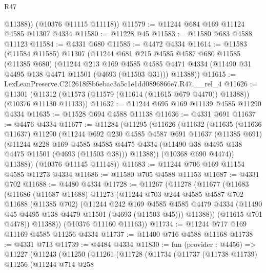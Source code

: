 \begin{lexlean}{R47}
\begin{coremodule}
          @11388))
      (@10376 @11115 @11118))
@11579 := @11244 @684 @169 @11124 @4585 @11307 @4334
@11580 := @11228 @45
@11583 := @11580 @683 @4588 @11123
@11584 := @4331 @680
@11585 := @4472 @4334
@11614 := @11583
    (@11584 @11585)
    @11307
    (@11244
      @681
      @215
      @4585
      @4587
      @680
      @11585
      (@11385 @680)
      (@11244
        @213
        @169
        @4585
        @4585
        @4471
        @4334
        (@11490 @31 @4495 @138 @4471 @11501 (@4693 (@11503 @31)))
        @11388))
@11615 := LexLeanPreserve.C212618f8b6ebac3a5c1e1dd0896866e7.R47.__rel_4
@11626 := @11301
    (@11312 (@11573 (@11579 (@11614 (@11615 @679 @4470)) @11388)) (@10376 @11130 @11133))
@11632 := @11244 @695 @169 @11139 @4585 @11290 @4334
@11635 := @11528 @694 @4588 @11138
@11636 := @4331 @691
@11637 := @4476 @4334
@11677 := @11284
    (@11295
      (@11626
        (@11632
          (@11635
            (@11636 @11637)
            @11290
            (@11244
              @692
              @230
              @4585
              @4587
              @691
              @11637
              (@11385 @691)
              (@11244
                @228
                @169
                @4585
                @4585
                @4475
                @4334
                (@11490 @38 @4495 @138 @4475 @11501 (@4693 (@11503 @38)))
                @11388))
            (@10368 @690 @4474))
          @11388))
      (@10376 @11145 @11148))
@11683 := @11244 @706 @169 @11154 @4585 @11273 @4334
@11686 := @11580 @705 @4588 @11153
@11687 := @4331 @702
@11688 := @4480 @4334
@11728 := @11267
    (@11278
      (@11677
        (@11683
          (@11686
            (@11687 @11688)
            @11273
            (@11244
              @703
              @244
              @4585
              @4587
              @702
              @11688
              (@11385 @702)
              (@11244
                @242
                @169
                @4585
                @4585
                @4479
                @4334
                (@11490 @45 @4495 @138 @4479 @11501 (@4693 (@11503 @45)))
                @11388))
            (@11615 @701 @4478))
          @11388))
      (@10376 @11160 @11163))
@11734 := @11244 @717 @169 @11169 @4585 @11256 @4334
@11737 := @11400 @716 @4588 @11168
@11738 := @4331 @713
@11739 := @4484 @4334
@11830 := fun (provider : @4456) =>
  @11227
    (@11243
      (@11250
        (@11261
          (@11728
            (@11734
              (@11737
                (@11738 @11739)
                @11256
                (@11244
                  @714
                  @258

\end{coremodule}
\end{lexlean}
